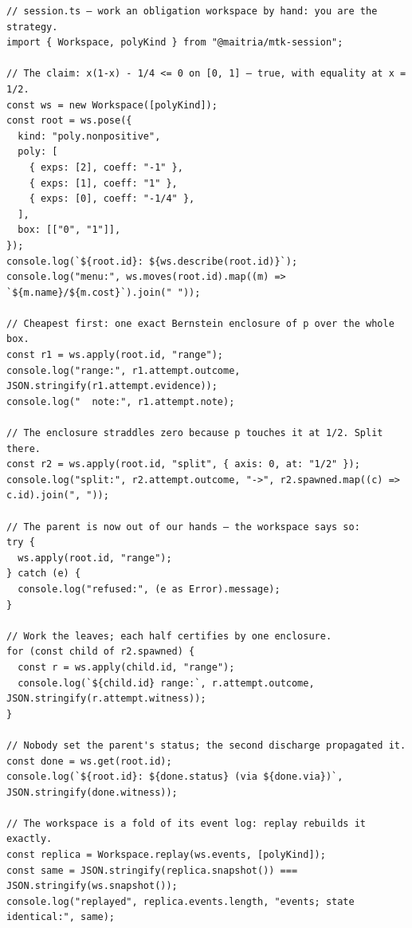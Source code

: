 \begin{Verbatim}[fontsize=\small,frame=leftline,rulecolor=\color{accentmid},framesep=3mm,xleftmargin=3mm]
// session.ts — work an obligation workspace by hand: you are the strategy.
import { Workspace, polyKind } from "@maitria/mtk-session";

// The claim: x(1-x) - 1/4 <= 0 on [0, 1] — true, with equality at x = 1/2.
const ws = new Workspace([polyKind]);
const root = ws.pose({
  kind: "poly.nonpositive",
  poly: [
    { exps: [2], coeff: "-1" },
    { exps: [1], coeff: "1" },
    { exps: [0], coeff: "-1/4" },
  ],
  box: [["0", "1"]],
});
console.log(`${root.id}: ${ws.describe(root.id)}`);
console.log("menu:", ws.moves(root.id).map((m) => `${m.name}/${m.cost}`).join(" "));

// Cheapest first: one exact Bernstein enclosure of p over the whole box.
const r1 = ws.apply(root.id, "range");
console.log("range:", r1.attempt.outcome, JSON.stringify(r1.attempt.evidence));
console.log("  note:", r1.attempt.note);

// The enclosure straddles zero because p touches it at 1/2. Split there.
const r2 = ws.apply(root.id, "split", { axis: 0, at: "1/2" });
console.log("split:", r2.attempt.outcome, "->", r2.spawned.map((c) => c.id).join(", "));

// The parent is now out of our hands — the workspace says so:
try {
  ws.apply(root.id, "range");
} catch (e) {
  console.log("refused:", (e as Error).message);
}

// Work the leaves; each half certifies by one enclosure.
for (const child of r2.spawned) {
  const r = ws.apply(child.id, "range");
  console.log(`${child.id} range:`, r.attempt.outcome, JSON.stringify(r.attempt.witness));
}

// Nobody set the parent's status; the second discharge propagated it.
const done = ws.get(root.id);
console.log(`${root.id}: ${done.status} (via ${done.via})`, JSON.stringify(done.witness));

// The workspace is a fold of its event log: replay rebuilds it exactly.
const replica = Workspace.replay(ws.events, [polyKind]);
const same = JSON.stringify(replica.snapshot()) === JSON.stringify(ws.snapshot());
console.log("replayed", replica.events.length, "events; state identical:", same);
\end{Verbatim}
